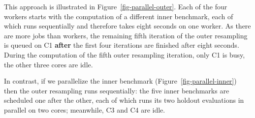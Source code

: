 \begin{Shaded}
\begin{Highlighting}[]
\SpecialCharTok{::}\NormalTok{(}\NormalTok{(}\NormalTok{, }\NormalTok{))}

\SpecialCharTok{::}\NormalTok{(}\NormalTok{)}
\end{Highlighting}
\end{Shaded}

This approach is illustrated in Figure~\ref{fig-parallel-outer}. Each of
the four workers starts with the computation of a different inner
benchmark, each of which runs sequentially and therefore takes eight
seconds on one worker. As there are more jobs than workers, the
remaining fifth iteration of the outer resampling is queued on C1
\textbf{after} the first four iterations are finished after eight
seconds. During the computation of the fifth outer resampling iteration,
only C1 is busy, the other three cores are idle.

In contrast, if we parallelize the inner benchmark
(Figure~\ref{fig-parallel-inner}) then the outer resampling runs
sequentially: the five inner benchmarks are scheduled one after the
other, each of which runs its two holdout evaluations in parallel on two
cores; meanwhile, C3 and C4 are idle.

\begin{Shaded}
\begin{Highlighting}[]
\SpecialCharTok{::}\NormalTok{(}\NormalTok{(}\NormalTok{, }\NormalTok{))}
\end{Highlighting}
\end{Shaded}

